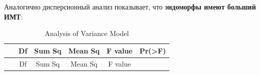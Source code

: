 \documentclass[
]{article}
\newenvironment{Shaded}{\begin{snugshade}}{\end{snugshade}}
\newcommand{\KeywordTok}[1]{\textcolor[rgb]{0.13,0.29,0.53}{\textbf{#1}}}
\newcommand{\NormalTok}[1]{#1}
\newcommand{\OperatorTok}[1]{\textcolor[rgb]{0.81,0.36,0.00}{\textbf{#1}}}
\newcommand{\StringTok}[1]{\textcolor[rgb]{0.31,0.60,0.02}{#1}}
\begin{document}
Аналогично дисперсионный анализ показывает, что \textbf{эндоморфы имеют
больший ИМТ}:

\begin{Shaded}
\end{Shaded}

\begin{longtable}[]{@{}cccccc@{}}
\caption{Analysis of Variance Model}\tabularnewline
\toprule
\begin{minipage}[b]{0.19\columnwidth}\centering
~\strut
\end{minipage} & \begin{minipage}[b]{0.07\columnwidth}\centering
Df\strut
\end{minipage} & \begin{minipage}[b]{0.10\columnwidth}\centering
Sum Sq\strut
\end{minipage} & \begin{minipage}[b]{0.12\columnwidth}\centering
Mean Sq\strut
\end{minipage} & \begin{minipage}[b]{0.12\columnwidth}\centering
F value\strut
\end{minipage} & \begin{minipage}[b]{0.14\columnwidth}\centering
Pr(\textgreater F)\strut
\end{minipage}\tabularnewline
\midrule
\endfirsthead
\toprule
\begin{minipage}[b]{0.19\columnwidth}\centering
~\strut
\end{minipage} & \begin{minipage}[b]{0.07\columnwidth}\centering
Df\strut
\end{minipage} & \begin{minipage}[b]{0.10\columnwidth}\centering
Sum Sq\strut
\end{minipage} & \begin{minipage}[b]{0.12\columnwidth}\centering
Mean Sq\strut
\end{minipage} & \begin{minipage}[b]{0.12\columnwidth}\centering
F value\strut
\end{minipage} & \begin{minipage}[b]{0.14\columnwidth}\centering

\end{minipage}
\end{longtable}
\end{document}
